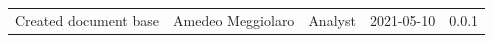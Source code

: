 \documentclass[a4paper]{article}
\begin{document}
\begin{center}
\begin{table}[h!]
\begin{tabular}{p{150px} p{90px} p{80px} p{60px} p{45px}}
            Created document base                                & Amedeo Meggiolaro & Analyst       & 2021-05-10    & 0.0.1            \\
        \end{tabular}
    \end{table}
\end{center}

\newpage
\tableofcontents
\newpage
\newpage
\listoffigures
\newpage




\end{document}

